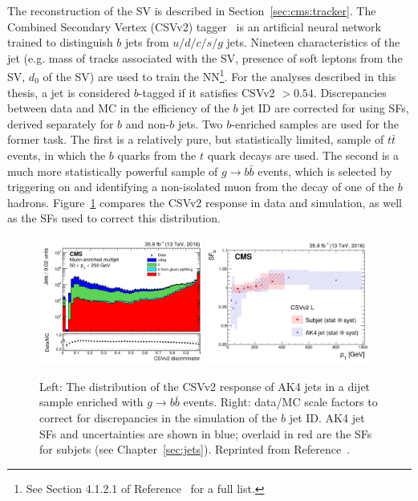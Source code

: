 The reconstruction of the SV is described in Section~\ref{sec:cms:tracker}.
The Combined Secondary Vertex (CSVv2) tagger~\cite{csvv2} is an artificial neural network trained to distinguish $b$ jets from $u/d/c/s/g$ jets. 
Nineteen characteristics of the jet (e.g. mass of tracks associated with the SV, presence of soft leptons from the SV, $d_0$ of the SV) are used to train the NN\footnote{See Section 4.1.2.1 of Reference~\cite{csvv2} for a full list.}.
For the analyses described in this thesis, a jet is considered $b$-tagged if it satisfies CSVv2 $>0.54$. 
Discrepancies between data and MC in the efficiency of the $b$ jet ID are corrected for using SFs, derived separately for $b$ and non-$b$ jets.
Two $b$-enriched samples are used for the former task.
The first is a relatively pure, but statistically limited, sample of $t\bar{t}$ events, in which the $b$ quarks from the $t$ quark decays are used.
The second is a much more statistically powerful sample of $g\rightarrow b\bar{b}$ events, which is selected by triggering on and identifying a non-isolated muon from the decay of one of the $b$ hadrons. 
Figure~\ref{fig:cms:csvv2} compares the CSVv2 response in data and simulation, as well as the SFs used to correct this distribution.

\begin{figure}[]
\begin{center}
    \includegraphics[width=0.48\textwidth]{figures/cms/csvv2.png}
    \includegraphics[width=0.48\textwidth]{figures/cms/csvsf.png}
    \caption{Left: The distribution of the CSVv2 response of AK4 jets in a dijet sample enriched with $g\rightarrow b\bar{b}$ events.
             Right: data/MC scale factors to correct for discrepancies in the simulation of the $b$ jet ID.
             AK4 jet SFs and uncertainties are shown in blue; overlaid in red are the SFs for subjets (see Chapter~\ref{sec:jets}).
             Reprinted from Reference~\cite{csvv2}.}
    \label{fig:cms:csvv2}
\end{center}
\end{figure}

